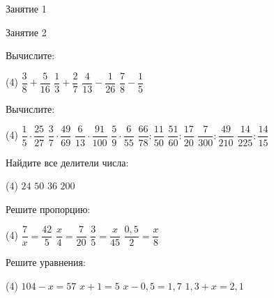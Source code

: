 %

\begin{class}[number=1]
	
	\begin{listofex}
		\item   Занятие 1
	\end{listofex}
\end{class}

\begin{class}[number=2]
	\begin{listofex}
		\item Занятие 2
	\end{listofex}
\end{class}

\begin{homework}[number=1]
	\begin{listofex}
		\item Вычислите:
		\begin{tasks}(4)
			\task \( \dfrac{ 3 }{ 8 }+\dfrac{ 5 }{ 16 } \)
			\task \( \dfrac{ 1 }{ 3 }+\dfrac{ 2 }{ 7 } \)
			\task \( \dfrac{ 4 }{ 13 }-\dfrac{ 1 }{ 26 } \)
			\task \( \dfrac{ 7 }{ 8 }-\dfrac{ 1 }{ 5 } \)
		\end{tasks}
		\item Вычислите:
		\begin{tasks}(4)
			\task \( \dfrac{ 1 }{ 5 }\cdot\dfrac{ 25 }{ 27 } \)
			\task \( \dfrac{ 3 }{ 7 }\cdot\dfrac{ 49 }{ 69 } \)
			\task \( \dfrac{ 6 }{ 13 }\cdot\dfrac{ 91 }{ 100 } \)
			\task \( \dfrac{ 5 }{ 9 }\cdot\dfrac{ 6 }{ 55 } \)
			\task \( \dfrac{ 66 }{ 78 }:\dfrac{ 11 }{ 50 } \)
			\task \( \dfrac{ 51 }{ 60 }:\dfrac{ 17 }{ 20 } \)
			\task \( \dfrac{ 7 }{ 300 }:\dfrac{ 49 }{ 210 } \)
			\task \( \dfrac{ 14 }{ 225 }:\dfrac{ 14 }{ 15 } \)
		\end{tasks}
		\item Найдите все делители числа:
		\begin{tasks}(4)
			\task \( 24 \)
			\task \( 50 \)
			\task \( 36 \)
			\task \( 200 \)
		\end{tasks}
		\item Решите пропорцию:
		\begin{tasks}(4)
			\task \( \dfrac{ 7 }{ x }=\dfrac{ 42 }{ 5 } \)
			\task \( \dfrac{ x }{ 4 }=\dfrac{ 7 }{ 20 } \)
			\task \( \dfrac{ 3 }{ 5 }=\dfrac{ x }{ 45 } \)
			\task \( \dfrac{ 0,5 }{ 2 }=\dfrac{ x }{ 8 } \)
		\end{tasks}
		\item Решите уравнения:
		\begin{tasks}(4)
			\task \( 104-x=57 \)
			\task \( x+1=5 \)
			\task \( x-0,5=1,7 \)
			\task \( 1,3+x=2,1 \)
		\end{tasks}
	\end{listofex}
\end{homework}


